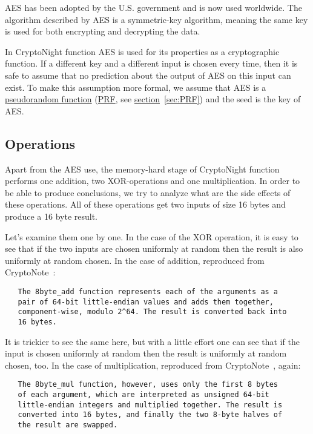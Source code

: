 AES has been adopted by the U.S. government and is now used worldwide. The algorithm described by AES is a symmetric-key algorithm, meaning the same key is used for both encrypting and decrypting the data.
\pagebreak

In CryptoNight function AES is used for its properties as a cryptographic function. If a different key and a different input is chosen every time, then it is safe to assume that no prediction about the output of AES on this input can exist. To make this assumption more formal, we assume that AES is a \hyperref[sec:PRF]{pseudorandom function} (\hyperref[sec:PRF]{PRF}, see \hyperref[sec:PRF]{section}~\ref{sec:PRF}) and the seed is the key of AES.


\subsection{Operations}
Apart from the AES use, the memory-hard stage of CryptoNight function performs one addition, two XOR-operations and one multiplication. In order to be able to produce conclusions, we try to analyze what are the side effects of these operations. All of these operations get two inputs of size 16 bytes and produce a 16 byte result.

Let's examine them one by one. In the case of the XOR operation, it is easy to see that if the two inputs are chosen uniformly at random then the result is also uniformly at random chosen. In the case of addition, reproduced from CryptoNote~\cite{cryptonight}:
\begin{verbatim}
   The 8byte_add function represents each of the arguments as a
   pair of 64-bit little-endian values and adds them together,
   component-wise, modulo 2^64. The result is converted back into
   16 bytes.
\end{verbatim}

It is trickier to see the same here, but with a little effort one can see that if the input is chosen uniformly at random then the result is uniformly at random chosen, too. In the case of multiplication, reproduced from CryptoNote~\cite{cryptonight}, again:
\begin{verbatim}
   The 8byte_mul function, however, uses only the first 8 bytes
   of each argument, which are interpreted as unsigned 64-bit
   little-endian integers and multiplied together. The result is
   converted into 16 bytes, and finally the two 8-byte halves of
   the result are swapped.
\end{verbatim}

